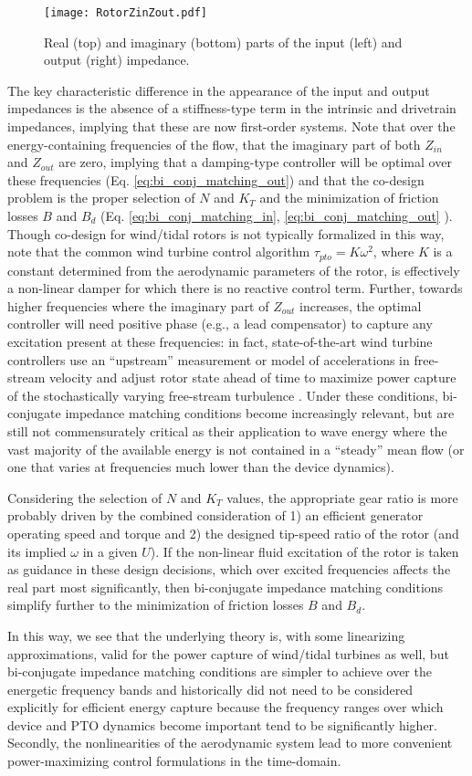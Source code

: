 \begin{figure}
	\centering \texttt{[image: RotorZinZout.pdf]}
	\caption{Real (top) and imaginary (bottom) parts of the input (left) and output (right) impedance.}
	\label{fig: RotorZinZout}
\end{figure}

The key characteristic difference in the appearance of the input and output impedances is the absence of a stiffness-type term in the intrinsic and drivetrain impedances, implying that these are now first-order systems. Note that over the energy-containing frequencies of the flow, that the imaginary part of both $Z_{in}$ and $Z_{out}$ are zero, implying that a damping-type controller will be optimal over these frequencies (Eq. \ref{eq:bi_conj_matching_out}) and that the co-design problem is the proper selection of $N$ and $K_T$ and the minimization of friction losses $B$ and $B_d$ (Eq. \ref{eq:bi_conj_matching_in}, \ref{eq:bi_conj_matching_out} ). Though co-design for wind/tidal rotors is not typically formalized in this way, note that the common wind turbine control algorithm $\tau_{pto} = K\omega^2$, where $K$ is a constant determined from the aerodynamic parameters of the rotor, is effectively a non-linear damper for which there is no reactive control term. Further, towards higher frequencies where the imaginary part of $Z_{out}$ increases, the optimal controller will need positive phase (e.g., a lead compensator) to capture any excitation present at these frequencies: in fact, state-of-the-art wind turbine controllers use an ``upstream'' measurement or model of accelerations in free-stream velocity and adjust rotor state ahead of time to maximize power capture of the stochastically varying free-stream turbulence \cite{Schlipf2013b}. Under these conditions, bi-conjugate impedance matching conditions become increasingly relevant, but are still not commensurately critical as their application to wave energy where the vast majority of the available energy is not contained in a ``steady'' mean flow (or one that varies at frequencies much lower than the device dynamics).

Considering the selection of $N$ and $K_T$ values, the appropriate gear ratio is more probably driven by the combined consideration of 1) an efficient generator operating speed and torque and 2) the designed tip-speed ratio of the rotor (and its implied $\omega$ in a given $U$). If the non-linear fluid excitation of the rotor is taken as guidance in these design decisions, which over excited frequencies affects the real part most significantly, then bi-conjugate impedance matching conditions simplify further to the minimization of friction losses $B$ and $B_d$.

In this way, we see that the underlying theory is, with some linearizing approximations, valid for the power capture of wind/tidal turbines as well, but bi-conjugate impedance matching conditions are simpler to achieve over the energetic frequency bands and historically did not need to be considered explicitly for efficient energy capture because the frequency ranges over which device and PTO dynamics become important tend to be significantly higher. Secondly, the nonlinearities of the aerodynamic system lead to more convenient power-maximizing control formulations in the time-domain. 